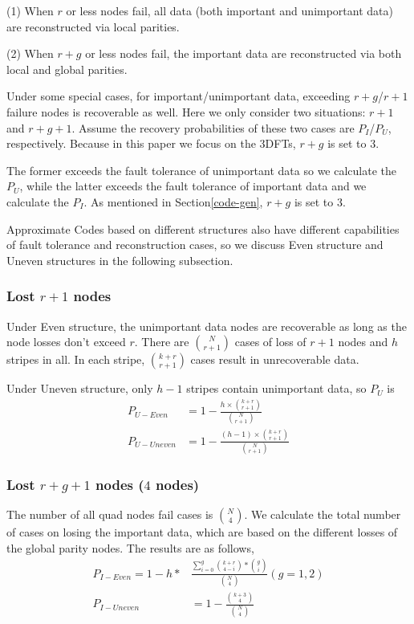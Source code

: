 \documentclass[sigconf]{acmart}
\begin{document}
(1) When $r$ or less nodes fail, all data (both important and unimportant data) are reconstructed via local parities.

(2) When $r+g$ or less nodes fail, the important data are reconstructed via both local and global parities.

Under some special cases, for important/unimportant data, exceeding $r+g$/$r+1$ failure nodes is recoverable as well. 
Here we only consider two situations: $r+1$ and $r+g+1$. Assume the recovery probabilities of these two cases are $P_{I}$/$P_{U}$, respectively. Because in this paper we focus on the 3DFTs, $r+g$ is set to 3.

The former exceeds the fault tolerance of unimportant data so we calculate the $P_{U}$, while the latter exceeds the fault tolerance of important data and we calculate the $P_{I}$.
As mentioned in Section\ref{code-gen}, $r+g$ is set to 3.

Approximate Codes based on different structures also have different capabilities of fault tolerance and reconstruction cases, so we discuss Even structure and Uneven structures in the following subsection.

\subsubsection{Lost $r+1$ nodes}
Under Even structure, the unimportant data nodes are recoverable as long as the node losses don't exceed $r$.
There are $\binom{N}{r+1}$ cases of loss of $r+1$ nodes and $h$ stripes in all. In each stripe, $\binom{k+r}{r+1}$ cases result in unrecoverable data.

Under Uneven structure, only $h-1$ stripes contain unimportant data, so $P_{U}$ is
\begin{align}
    P_{U-Even} &= 1 - \frac{h \times \binom{k+r}{r+1}}{\binom{N}{r+1}}\\
    P_{U-Uneven} &= 1 - \frac{(h-1) \times \binom{k+r}{r+1}}{\binom{N}{r+1}}
\end{align}

\subsubsection{Lost $r+g+1$ nodes ($4$ nodes)}
The number of all quad nodes fail cases is $\binom{N}{4}$.
We calculate the total number of cases on losing the important data, which are based on the different losses of the global parity nodes. The results are as follows,
\begin{align}
    P_{I-Even} = 1 - h*&\frac{\sum_{i=0}^{g} {\binom{k+r}{4-i}*\binom{g}{i}} }{\binom{N}{4}}  (g=1,2)\\
    P_{I-Uneven} &= 1 - \frac{\binom{k+3}{4}}{\binom{N}{4}}
\end{align}
\end{document}
